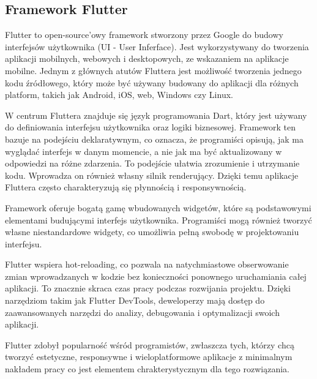 \documentclass[12pt,twoside,draft]{article}
\begin{document}
\subsection{Framework Flutter}
{Flutter to open-source'owy framework stworzony przez Google do budowy interfejsów użytkownika (UI - User Inferface). 
Jest wykorzystywany do tworzenia aplikacji mobilnych, webowych i desktopowych, ze wskazaniem na aplikacje mobilne. 
Jednym z głównych atutów Fluttera jest możliwość tworzenia jednego kodu źródłowego, który może być używany budowany do
 aplikacji dla różnych platform, takich jak Android, iOS, web, Windows czy Linux.

W centrum Fluttera znajduje się język programowania Dart, który jest używany do definiowania interfejsu użytkownika oraz logiki biznesowej. 
Framework ten bazuje na podejściu deklaratywnym, co oznacza, że programiści opisują, jak ma wyglądać interfejs w danym momencie,
 a nie jak ma być aktualizowany w odpowiedzi na różne zdarzenia. To podejście ułatwia zrozumienie i utrzymanie kodu.
Wprowadza on również własny silnik renderujący. Dzięki temu aplikacje Fluttera często charakteryzują się płynnością i responsywnością.

Framework oferuje bogatą gamę wbudowanych widgetów, które są podstawowymi elementami budującymi interfejs użytkownika. 
Programiści mogą również tworzyć własne niestandardowe widgety, co umożliwia pełną swobodę w projektowaniu interfejsu.

Flutter wspiera hot-reloading, co pozwala na natychmiastowe obserwowanie zmian wprowadzanych w kodzie bez konieczności ponownego uruchamiania całej aplikacji.
To znacznie skraca czas pracy podczas rozwijania projektu.
Dzięki narzędziom takim jak Flutter DevTools, deweloperzy mają dostęp do zaawansowanych narzędzi do analizy, debugowania i optymalizacji swoich aplikacji.

Flutter zdobył popularność wśród programistów, zwłaszcza tych, którzy chcą tworzyć estetyczne, responsywne i wieloplatformowe 
aplikacje z minimalnym nakładem pracy co jest elementem chrakterystycznym dla tego rozwiązania.}
\end{document}
